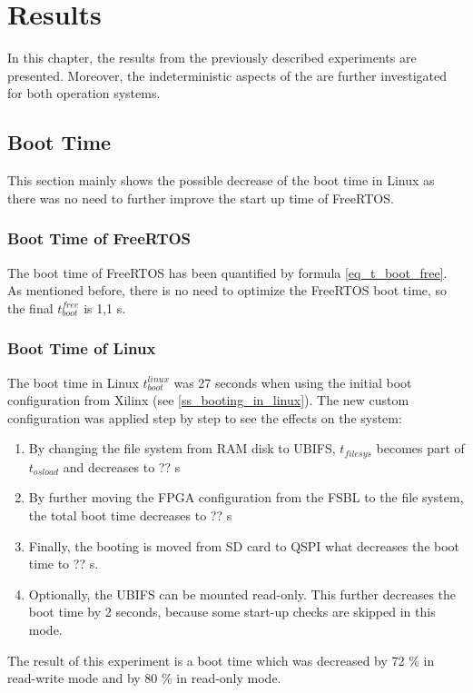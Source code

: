 \chapter{Results}\label{ch_results}
In this chapter, the results from the previously described experiments are presented.
Moreover, the indeterministic aspects of the are further investigated for both operation systems. 

\section{Boot Time}
This section mainly shows the possible decrease of the boot time in Linux as there was no need to further improve the start up time of FreeRTOS.

\subsection{Boot Time of FreeRTOS}
The boot time of FreeRTOS has been quantified by formula \ref{eq_t_boot_free}.
As mentioned before, there is no need to optimize the FreeRTOS boot time, so the final $ t_{boot}^{free} $ is 1,1 s.

\subsection{Boot Time of Linux}
The boot time in Linux $ t_{boot}^{linux} $ was 27 seconds when using the initial boot configuration from Xilinx (see \ref{ss_booting_in_linux}). 
The new custom configuration was applied step by step to see the effects on the system:
 
\begin{enumerate}
	\item By changing the file system from \ac{RAM} disk to \ac{UBIFS}, $t_{filesys}$ becomes part of $t_{osload}$ and decreases to ?? s
	\item By further moving the \ac{FPGA} configuration from the \ac{FSBL} to the file system, the total boot time decreases to ?? s 
	\item Finally, the booting is moved from \ac{SD} card to \ac{QSPI} what decreases the boot time to ?? s.
	\item Optionally, the \ac{UBIFS} can be mounted read-only. This further decreases the boot time by 2 seconds, because some start-up checks are skipped in this mode. 
\end{enumerate}

The result of this experiment is a boot time which was decreased by 72 \% in read-write mode and by 80 \% in read-only mode.

